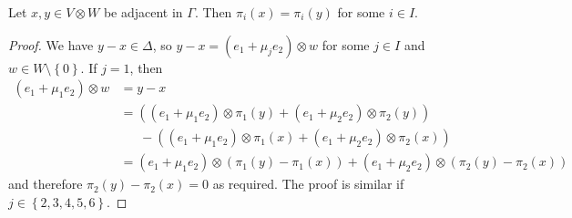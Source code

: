 \begin{lemma} \label{lm:adjacency-implies-clique}
Let $x, y \in V \otimes W$ be adjacent in $\Gamma$. Then $\pi_i{\left(x \right)} = \pi_i{\left(y \right)}$ for some $i \in I$.
\end{lemma}
\begin{proof}
We have $y-x \in \Delta$, so $y-x = \left(e_1 + \mu_j e_2 \right) \otimes w$ for some $j \in I$ and $w \in W \setminus \left\{0 \right\}$. If $j=1$, then
\begin{align*}
    \left(e_1 + \mu_1 e_2 \right) \otimes w &= y-x \\
    &= \left(\left(e_1 + \mu_1 e_2 \right) \otimes \pi_1{\left(y \right)} + \left(e_1 + \mu_2 e_2 \right) \otimes \pi_2{\left(y \right)}\right) \\
    &\ \ \ \ \ \ \ - \left(\left(e_1 + \mu_1 e_2 \right) \otimes \pi_1{\left(x \right)} + \left(e_1 + \mu_2 e_2 \right) \otimes \pi_2{\left(x \right)}\right) \\
    &= \left(e_1 + \mu_1 e_2 \right) \otimes \left(\pi_1{\left(y \right)} - \pi_1{\left(x \right)}\right) + \left(e_1 + \mu_2 e_2 \right) \otimes \left(\pi_2{\left(y \right)} - \pi_2{\left(x \right)}\right)
\end{align*}
and therefore $\pi_2{\left(y \right)} - \pi_2{\left(x \right)} = 0$ as required. The proof is similar if $j \in \left\{2, 3, 4, 5, 6 \right\}$.
\end{proof}

